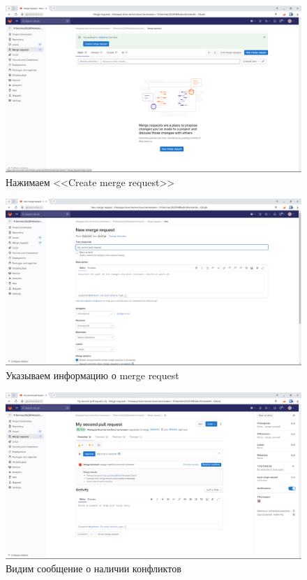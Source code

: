 \documentclass[a4paper]{article}
\begin{document}
  \begin{figure}[H]
    \centering
    \includegraphics[width=\textwidth]{1_ (16)}
    \caption{Нажимаем <<Create merge request>>}
  \end{figure}

  \begin{figure}[H]
    \centering
    \includegraphics[width=\textwidth]{1_ (15)}
    \caption{Указываем информацию о merge request}
  \end{figure}

  \begin{figure}[H]
    \centering
    \includegraphics[width=\textwidth]{1_ (14)}
    \caption{Видим сообщение о наличии конфликтов}
  \end{figure}
\end{document}
